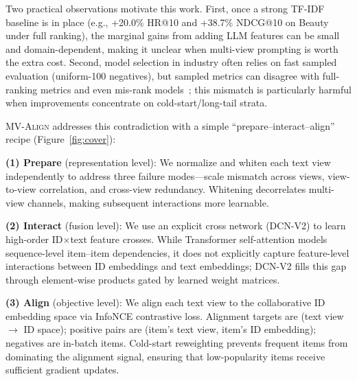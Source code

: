 \documentclass[sigconf,natbib=true]{acmart}
\newcommand{\model}{\textsc{MV-Align}\xspace}
\newcommand{\tfidf}{\textsc{TF-IDF}\xspace}
\newcommand{\llm}{\textsc{LLM}\xspace}
\begin{document}
Two practical observations motivate this work. First, once a
strong \tfidf baseline is in place (e.g., +20.0\% HR@10 and
+38.7\% NDCG@10 on Beauty under full ranking), the marginal
gains from adding \llm features can be small and domain-dependent,
making it unclear when multi-view prompting is worth the extra
cost. Second, model selection in industry often relies on fast
sampled evaluation (uniform-100 negatives), but
sampled metrics can disagree with full-ranking metrics and even
mis-rank models~\cite{krichene2020sampledmetrics}; this mismatch
is particularly harmful when improvements concentrate on
cold-start/long-tail strata.

\model addresses this contradiction with a simple
``prepare--interact--align'' recipe (Figure~\ref{fig:cover}):

\textbf{(1) Prepare} (representation level): We normalize
and whiten each text view independently to address three failure
modes---scale mismatch across views, view-to-view correlation,
and cross-view redundancy. Whitening decorrelates multi-view
channels, making subsequent interactions more learnable.

\textbf{(2) Interact} (fusion level): We use an explicit cross
network (DCN-V2) to learn high-order ID$\times$text feature
crosses. While Transformer self-attention models sequence-level
item--item dependencies, it does not explicitly capture
feature-level interactions between ID embeddings and text
embeddings; DCN-V2 fills this gap through element-wise products
gated by learned weight matrices.

\textbf{(3) Align} (objective level): We align each text view
to the collaborative ID embedding space via InfoNCE contrastive
loss. Alignment targets are (text view $\to$ ID space); positive
pairs are (item's text view, item's ID embedding); negatives are
in-batch items. Cold-start reweighting prevents frequent items
from dominating the alignment signal, ensuring that
low-popularity items receive sufficient gradient updates.
\end{document}
